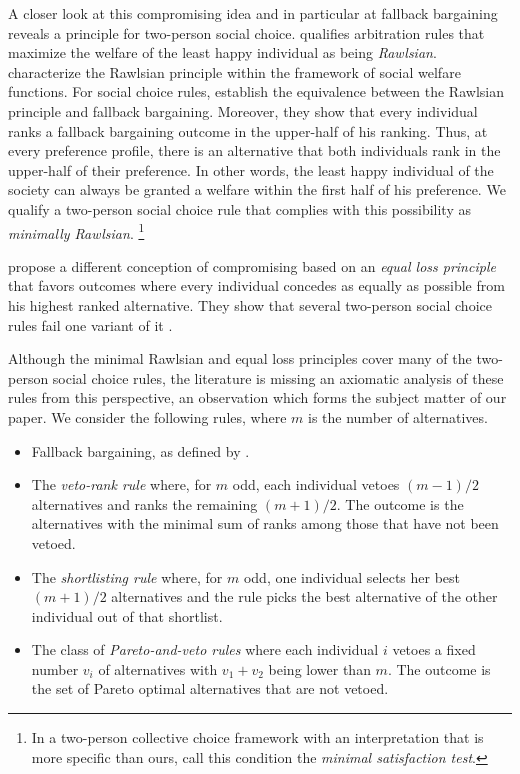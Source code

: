 \documentclass[version=3.21, pagesize, twoside=off, bibliography=totoc, DIV=calc, fontsize=12pt, a4paper]{scrartcl}
\begin{document}
A closer look at this compromising idea and in particular at fallback bargaining reveals a principle for two-person social choice.  qualifies arbitration rules that maximize the welfare of the least happy individual as being \textit{Rawlsian}. \citet{congar2012characterization} characterize the Rawlsian principle within the framework of social welfare functions. For social choice rules, \citet{BramsKilgour2001} establish the equivalence between the Rawlsian principle and fallback bargaining. Moreover, they show that every individual ranks a fallback bargaining outcome in the upper-half of his ranking. Thus, at every preference profile, there is an alternative that both individuals rank in the upper-half of their preference. In other words, the least happy individual of the society can always be granted a welfare within the first half of his preference. We qualify a two-person social choice rule that complies with this possibility as \textit{minimally Rawlsian}.%
\footnote{In a two-person collective choice framework with an interpretation that is more specific than ours, \citet{Clippel} call this condition the \textit{minimal satisfaction test}.}

 propose a different conception of compromising based on an \textit{equal loss principle} that favors outcomes where every individual concedes as equally as possible from his highest ranked alternative. They show that several two-person social choice rules fail one variant of it .

Although the minimal Rawlsian and equal loss principles cover many of the two-person social choice rules, the literature is missing an axiomatic analysis of these rules from this perspective, an observation which forms the subject matter of our paper. We consider the following rules, where $m$ is the number of alternatives.
\begin{itemize}
	\item Fallback bargaining, as defined by \citet{BramsKilgour2001}.
	\item The \textit{veto-rank rule} where, for $m$ odd, each individual vetoes $(m - 1) / 2$ alternatives and ranks the remaining $(m+1) / 2$. The outcome is the alternatives with the minimal sum of ranks among those that have not been vetoed.
	\item The \textit{shortlisting rule} where, for $m$ odd, one individual selects her best $(m+1) / 2$ alternatives and the rule picks the best alternative of the other individual out of that shortlist.
	\item The class of \textit{Pareto-and-veto rules} where each individual $i$ vetoes a fixed number $v_i$ of alternatives with $v_1 + v_2$ being lower than $m$. The outcome is the set of Pareto optimal alternatives that are not vetoed. 
\end{itemize}
\end{document}

